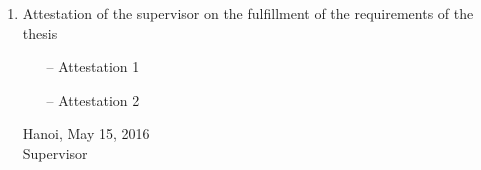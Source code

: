 \begin{requirement}
\begin{enumerate}[leftmargin=*]
	\item Attestation of the supervisor on the fulfillment of the requirements of the thesis
	\begin{itemize}
		\item[--] Attestation 1
		\item[--] Attestation 2
	\end{itemize}
	\flushright
	\begin{minipage}{0.5\linewidth}
		\centering
		Hanoi, May 15, 2016\\
		Supervisor\\
		\vspace{30pt}
		\supervisor
	\end{minipage}	
\end{enumerate}
\end{requirement}